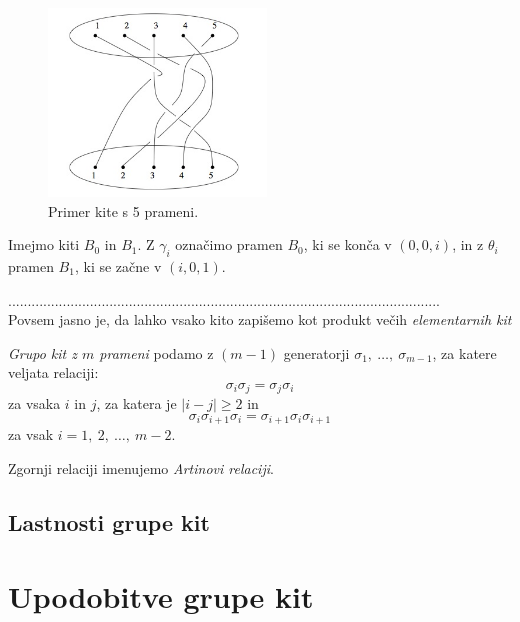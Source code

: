 \documentclass[mat1]{fmfdelo}
\begin{document}
\begin{figure}[h!]
\includegraphics[height = 5cm]{Primer_kite_1}
\caption{Primer kite s 5 prameni.}
\end{figure}


Imejmo kiti $B_0$ in $B_1$. Z $\gamma_i$ označimo pramen $B_0$, ki se konča v $(0, 0, i)$, in z $\theta_i$ pramen $B_1$, ki se začne v $(i, 0, 1)$.

...............................................................................................................\\

Povsem jasno je, da lahko vsako kito zapišemo kot produkt večih \emph{elementarnih kit}

\begin{definicija}
\emph{Grupo kit z $m$ prameni} podamo z $(m - 1)$ generatorji $\sigma_1,\ \ldots ,\ \sigma_{m - 1}$, za katere veljata relaciji: $$ \sigma_i \sigma_j = \sigma_j \sigma_i $$ za vsaka $i$ in $j$, za katera je $|i - j| \geq 2$ in $$\sigma_i \sigma_{i+1} \sigma_i = \sigma_{i+1} \sigma_i \sigma_{i+1}$$ za vsak $i = 1,\ 2,\ \ldots,\ m-2$.
\end{definicija}

\begin{opomba}
Zgornji relaciji imenujemo \emph{Artinovi relaciji}.
\end{opomba}

\subsection{Lastnosti grupe kit}


\section{Upodobitve grupe kit}
\end{document}
